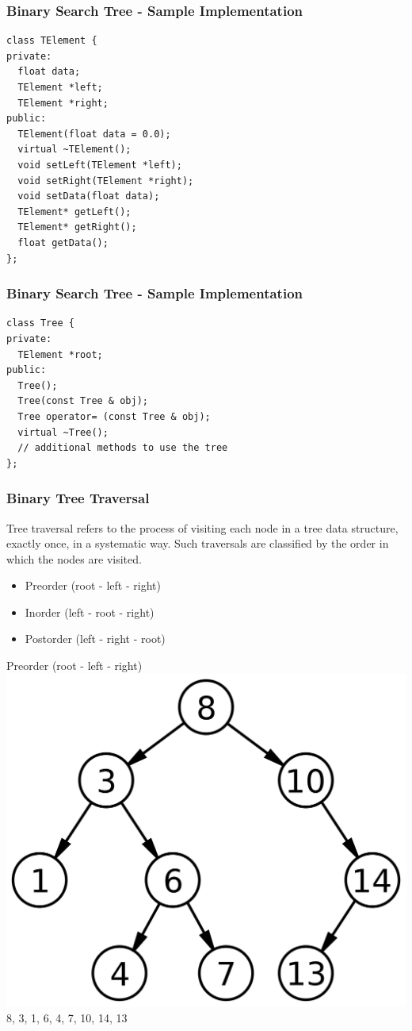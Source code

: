 \begin{frame}[fragile]
\frametitle{Binary Search Tree - Sample Implementation}
{\tiny
\begin{lstlisting}
class TElement {
private:
  float data;
  TElement *left;
  TElement *right;
public:
  TElement(float data = 0.0);
  virtual ~TElement();
  void setLeft(TElement *left);
  void setRight(TElement *right);
  void setData(float data);
  TElement* getLeft();
  TElement* getRight();
  float getData();
};
\end{lstlisting}
}
\end{frame}

\begin{frame}[fragile]
\frametitle{Binary Search Tree - Sample Implementation}
{\tiny
\begin{lstlisting}
class Tree {
private:
  TElement *root;
public:
  Tree();
  Tree(const Tree & obj);
  Tree operator= (const Tree & obj);
  virtual ~Tree();
  // additional methods to use the tree
};
\end{lstlisting}
}
\end{frame}

\begin{frame}[fragile]
\frametitle{Binary Tree Traversal}
Tree traversal refers to the process of visiting each node in a tree data structure,
exactly once, in a systematic way. Such traversals are classified by the order in
which the nodes are visited.
\begin{itemize}
\item Preorder (root - left - right)
\item Inorder (left - root - right)
\item Postorder (left - right - root)
\end{itemize}
\end{frame}

\begin{frame}[fragile]
Preorder (root - left - right)\\
\vspace{1mm}
\includegraphics[scale=0.05]{img/binarytree_2.png}\\
\vspace{1mm}
8, 3, 1, 6, 4, 7, 10, 14, 13
\end{frame}

